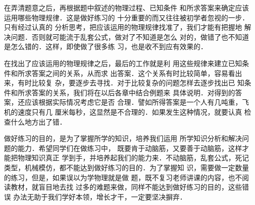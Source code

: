     在弄清题意之后，再根据题中叙述的物理过程、已知条件
和所求答案来确定应该运用哪些物理规律．这是做好练习的
十分重要的而又往往被初学者忽视的一步．只有经过认真的
分析思考，把应该运用的物理规律找准了，我们才能有把握地
解决问题．否则就可能流于乱套公式，做对了不知道是怎么
对的，做错了也不知道是怎么错的．这样，即使做了很多练
习，也是收不到应有效果的．

    在找出了应该运用的物理规律之后，最后的工作就是利
用这些规律来建立已知条件和所求答案之间的关系，从而求
出答案．这个关系有时比较简单，容易看出来，有时比较复
杂，要逐步去寻找．对于比较复杂的问题怎样去逐步找出已
知条件和所求答案的关系，我们将在以后各章中结合例题来
具体说明．对得到的答案，还应该根据实际情况考虑它是否
合理．譬如所得答案是一个人有几吨重，飞机的速度只有几
厘米每秒，这显然是不合理的．如果发生这种情况，就要认真
检查什么地方出了错．

    做好练习的目的，是为了掌握所学的知识，培养我们运用
所学知识分析和解决问题的能力．希望同学们在做练习中，
既要肯于动脑筋，又要善于动脑筋，这样才能把物理知识真正
学到手，并培养起我们的能力来．不动脑筋，乱套公式，死记
类型，机械模仿，都不能达到做好练习的目的．为了掌握知
识，需要做一定数量的练习，但是，如果误以为学物理就是做
题，既不复习老师讲课的内容，也不阅读教材，就盲目地去找
过多的难题来做，同样不能达到做好练习的目的，这些错误
办法无助于我们学好本领，增长才干，一定要坚决摒弃．